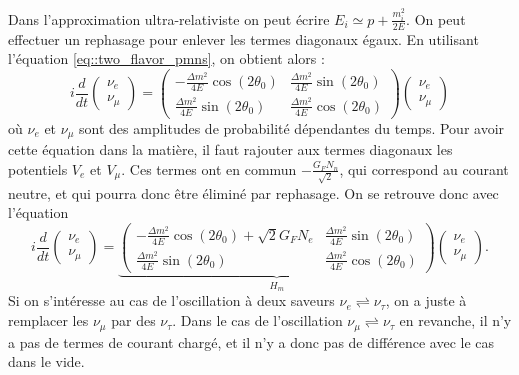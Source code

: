        Dans l'approximation ultra-relativiste on peut écrire $E_i \simeq p+ \frac{m_i^2}{2E}$. On peut effectuer un rephasage pour enlever les termes diagonaux égaux. En utilisant l'équation \eqref{eq::two_flavor_pmns}, on obtient alors :
        \begin{equation}
          i\frac{d}{dt}\left(\begin{matrix}\nu_e \\ \nu_{\mu}\end{matrix}\right) = \left(\begin{matrix}-\frac{\Delta m^2}{4E}\cos(2\theta_0) & \frac{\Delta m^2}{4E}\sin(2\theta_0) \\ \frac{\Delta m^2}{4E}\sin(2\theta_0) & \frac{\Delta m^2}{4E}\cos(2\theta_0)\end{matrix}\right)\left(\begin{matrix}\nu_e \\ \nu_{\mu}\end{matrix}\right)
        \end{equation}
        où $\nu_e$ et $\nu_{\mu}$ sont des amplitudes de probabilité dépendantes du temps. Pour avoir cette équation dans la matière, il faut rajouter aux termes diagonaux les potentiels $V_e$ et $V_{\mu}$. Ces termes ont en commun $-\frac{G_F N_n}{\sqrt{2}}$, qui correspond au courant neutre, et qui pourra donc être éliminé par rephasage. On se retrouve donc avec l'équation
        \begin{equation}\label{eq::hamiltonian_matter_2flavor}
          i\frac{d}{dt}\left(\begin{matrix}\nu_e \\ \nu_{\mu}\end{matrix}\right) = \underbrace{\left(\begin{matrix}-\frac{\Delta m^2}{4E}\cos(2\theta_0)+\sqrt{2}G_F N_e & \frac{\Delta m^2}{4E}\sin(2\theta_0) \\ \frac{\Delta m^2}{4E}\sin(2\theta_0) & \frac{\Delta m^2}{4E}\cos(2\theta_0)\end{matrix}\right)}_{H_m}\left(\begin{matrix}\nu_e \\ \nu_{\mu}\end{matrix}\right).
        \end{equation}
        Si on s'intéresse au cas de l'oscillation à deux saveurs $\nu_e\rightleftharpoons\nu_{\tau}$, on a juste à remplacer les $\nu_{\mu}$ par des $\nu_{\tau}$. Dans le cas de l'oscillation $\nu_{\mu}\rightleftharpoons\nu_{\tau}$ en revanche, il n'y a pas de termes de courant chargé, et il n'y a donc pas de différence avec le cas dans le vide.
        
